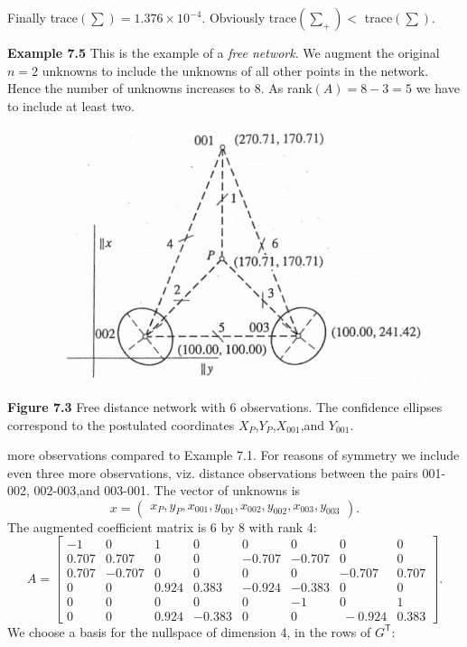 Finally trace$(\sum) = 1.376 \times 10^{-4}$. Obviously trace$(\sum_+)$$ <$ trace$(\sum)$.
\par\noindent
\textbf{Example 7.5} This is the example of a \emph{free network}. We augment the original $n = 2$ unknowns to include the unknowns of all other points in the network. Hence the number of unknowns increases to 8. As rank$(A) = 8 - 3 = 5$ we have to include at least two.
\begin{figure}
	\centering
	\includegraphics[width=0.4\linewidth]{TeX_files/Part02/chapter07/image/7-3.png}
	\caption{}
	\label{fig:7-3}
\end{figure}
\par\noindent
\textbf{Figure 7.3} Free distance network with 6 observations. The confidence ellipses correspond to the postulated coordinates $X_P$,$Y_P$,$X_{001}$,and $Y_{001}$.
\par\noindent
more observations compared to Example 7.1. For reasons of symmetry we include even three more observations, viz. distance observations between the pairs 001-002, 002-003,and 003-001. The vector of unknowns is
\begin{equation*}
	x =
	\begin{pmatrix}
		x_P,y_P,x_{001},y_{001},x_{002},
		y_{002},x_{003},y_{003}
	\end{pmatrix}.
\end{equation*}
The augmented coefficient matrix is 6 by 8 with rank 4:
\begin{equation*}
	A =
	\begin{bmatrix}
		-1 & 0 & 1 & 0 & 0 & 0 & 0 & 0\\
		0.707 & 0.707 & 0 & 0 & -0.707 & -0.707 & 0 & 0\\
		0.707 &-0.707& 0 &0 &0& 0& -0.707& 0.707\\
		0 & 0 &0.924& 0.383& -0.924 &-0.383& 0& 0\\
		0& 0 &0 &0 &0 &-1& 0& 1\\
		0& 0 &0.924 &-0.383& 0& 0&\ -0.924& 0.383
	\end{bmatrix}.
\end{equation*}
We choose a basis for the nullspace of dimension 4, in the rows of $G^\mathsf{T}$:
$$
